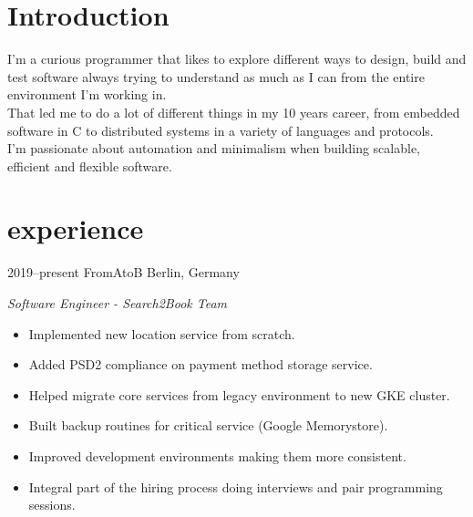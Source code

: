 \documentclass[]{friggeri-cv} %
\begin{document}
\section{Introduction}

\begin{entrylist}
\entry
{}
{}
{}
{
I'm a curious programmer that likes to explore different ways to design, build and test software
always trying to understand as much as I can from the entire environment I'm working in.\\

That led me to do a lot of different things in my 10 years career, from embedded
software in C to distributed systems in a variety of languages and protocols.\\

I'm passionate about automation and minimalism when building scalable, efficient and flexible software.
}
\end{entrylist}


\section{experience}

\begin{entrylist}
\entry
{2019--present}
{FromAtoB}
{Berlin, Germany}
{\emph{Software Engineer - Search2Book Team} \\

\begin{itemize}
  \item Implemented new location service from scratch.
  \item Added PSD2 compliance on payment method storage service.
  \item Helped migrate core services from legacy environment to new GKE cluster.
  \item Built backup routines for critical service (Google Memorystore).
  \item Improved development environments making them more consistent.
  \item Integral part of the hiring process doing interviews and pair programming sessions.
\end{itemize}

}
\end{entrylist}
\end{document}
